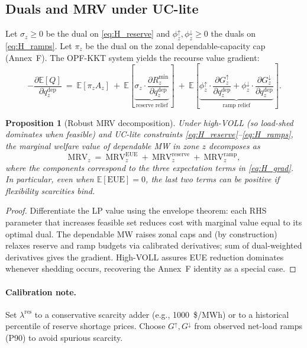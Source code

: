 \documentclass[11pt]{article}
\newcommand{\E}{\mathbb{E}}
\numberwithin{equation}{section}
\newtheorem{proposition}{Proposition}[section]
\theoremstyle{definition}
\theoremstyle{remark}
\begin{document}
\subsection{ Duals and MRV under UC-lite}

Let $\sigma_z\ge 0$ be the dual on \eqref{eq:H_reserve} and $\phi^{\uparrow}_z,\phi^{\downarrow}_z\ge 0$ the duals on \eqref{eq:H_ramps}. Let $\pi_{z}$ be the dual on the zonal dependable-capacity cap (Annex~F). The OPF-KKT system yields the recourse value gradient:
\begin{equation}
-\frac{\partial \E[Q]}{\partial q^{\mathrm{dep}}_{z}} \ =\ \E\!\left[\pi_{z} A_{z}\right] \ +\ \E\!\left[\underbrace{\sigma_{z}\cdot \frac{\partial R^{\min}_{z}}{\partial q^{\mathrm{dep}}_{z}}}_{\text{reserve relief}}\right] 
\ +\ \E\!\left[\underbrace{\phi^{\uparrow}_{z}\cdot \frac{\partial G^{\uparrow}_{z}}{\partial q^{\mathrm{dep}}_{z}} + \phi^{\downarrow}_{z}\cdot \frac{\partial G^{\downarrow}_{z}}{\partial q^{\mathrm{dep}}_{z}}}_{\text{ramp relief}}\right].
\label{eq:H_grad}
\end{equation}

\begin{proposition}[Robust MRV decomposition]
\label{prop:H_MRV}
Under high-VOLL (so load-shed dominates when feasible) and UC-lite constraints \eqref{eq:H_reserve}--\eqref{eq:H_ramps}, the marginal welfare value of dependable MW in zone $z$ decomposes as
\[
\mathrm{MRV}_z \ =\ \mathrm{MRV}_z^{\text{EUE}} \ +\ \mathrm{MRV}_z^{\text{reserve}} \ +\ \mathrm{MRV}_z^{\text{ramp}},
\]
where the components correspond to the three expectation terms in \eqref{eq:H_grad}. In particular, even when $\E[\mathrm{EUE}]=0$, the last two terms can be positive if flexibility scarcities bind.
\end{proposition}

\begin{proof}
Differentiate the LP value using the envelope theorem: each RHS parameter that increases feasible set reduces cost with marginal value equal to its optimal dual. The dependable MW raises zonal caps and (by construction) relaxes reserve and ramp budgets via calibrated derivatives; sum of dual-weighted derivatives gives the gradient. High-VOLL assures EUE reduction dominates whenever shedding occurs, recovering the Annex~F identity as a special case. 
\end{proof}

\paragraph{Calibration note.}
Set $\lambda^{\mathrm{res}}$ to a conservative scarcity adder (e.g., \SI{1000}{\$/MWh}) or to a historical percentile of reserve shortage prices. Choose $G^{\uparrow},G^{\downarrow}$ from observed net-load ramps (P90) to avoid spurious scarcity.
\end{document}
